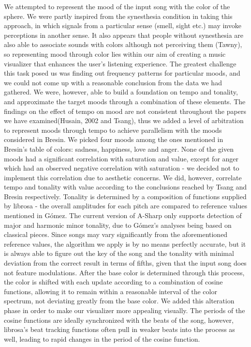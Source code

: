 \documentclass{article}
\begin{document}
We attempted to represent the mood of the input song with the color of the sphere. We were partly inspired from the synesthesia condition in taking this approach, in which signals from a particular sense (smell, sight etc.) may invoke perceptions in another sense. It also appears that people without synesthesia are also able to associate sounds with colors although not perceiving them (Tawny), so representing mood through color lies within our aim of creating a music visualizer that enhances the user’s listening experience.
The greatest challenge this task posed us was finding out frequency patterns for particular moods, and we could not come up with a reasonable conclusion from the data we had gathered. We were, however, able to build a foundation on tempo and tonality, and approximate the target moods through a combination of these elements. The findings on the effect of tempo on mood are not consistent throughout the papers we have examined(Husain, 2002 and Tsang), thus we added a level of arbitration to represent moods through tempo to achieve parallelism with the moods considered in Bresin. We picked four moods among the ones mentioned in Bresin's table of colors: sadness, happiness, love and anger. None of the given moods had a significant correlation with saturation and value, except for anger which had an observed negative correlation with saturation - we decided not to implement this correlation due to aesthetic concerns. We did, however, correlate tempo and tonality with value according to the conclusions reached by Tsang and Bresin respectively.
Tonality is determined by a composition of functions supplied by librosa - the overall amplitudes for each pitch are compared to reference values mentioned in Gómez. The current version of A-Sharp only supports detection of major and harmonic minor tonality, due to Gómez's analyses being based on classical pieces. Since songs may vary significantly from the aforementioned reference values, the algorithm we apply is by no means perfectly accurate, but it is always able to figure out the key of the song and the tonality with minimal deviation from the correct result in terms of fifths, given that the input song does not feature modulations.
After the base color is determined through this process, the color is shifted with each update according to a combination of cosine functions, allowing it to remain within a reasonable interval of the color spectrum, not deviating greatly from the base color. We added this alteration phase in order to make our visualizer more appealing visually. The periods of the cosine functions are ideally synchronized with the beats of the song, however, librosa's beat tracking functions often pull in weaker beats into the process as well, leading to rapid changes in the period of the cosine function.
\end{document}
